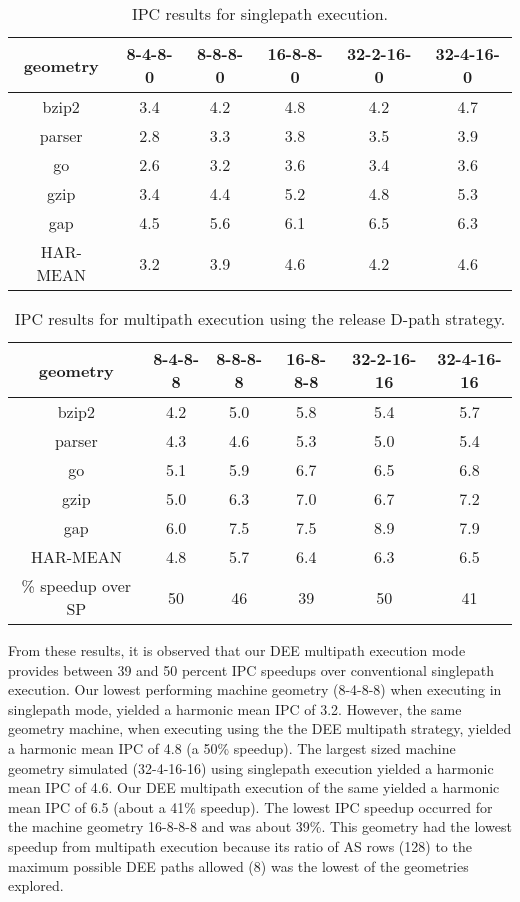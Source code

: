 \documentclass[10pt,twocolumn,dvips]{article}
\begin{document}
\begin{table*}
\scriptsize{
\begin{center}
\caption{IPC results for singlepath execution.}
\label{tab:ipc1}
\begin{tabular}{|c|c|c|c|c|c|}
\hline 
geometry&
8-4-8-0&
8-8-8-0&
16-8-8-0&
32-2-16-0&
32-4-16-0\\
\hline 
\hline
bzip2&3.4&4.2&4.8&4.2&4.7\\
\hline 
parser&2.8&3.3&3.8&3.5&3.9\\
\hline 
go&2.6&3.2&3.6&3.4&3.6\\
\hline 
gzip&3.4&4.4&5.2&4.8&5.3\\
\hline 
gap&4.5&5.6&6.1&6.5&6.3\\
\hline
\hline 
HAR-MEAN&3.2&3.9&4.6&4.2&4.6\\
\hline
\end{tabular}
\end{center}
}
\end{table*}
%
%
\begin{table*}
\scriptsize{
\begin{center}
\caption{IPC results for multipath execution using the 
release D-path strategy.}
\label{tab:ipc3}
\begin{tabular}{|c|c|c|c|c|c|}
\hline 
geometry&
8-4-8-8&
8-8-8-8&
16-8-8-8&
32-2-16-16&
32-4-16-16\\
\hline 
\hline
bzip2&4.2&5.0&5.8&5.4&5.7\\
\hline 
parser&4.3&4.6&5.3&5.0&5.4\\
\hline 
go&5.1&5.9&6.7&6.5&6.8\\
\hline 
gzip&5.0&6.3&7.0&6.7&7.2\\
\hline 
gap&6.0&7.5&7.5&8.9&7.9\\
\hline 
\hline 
HAR-MEAN&4.8&5.7&6.4&6.3&6.5\\
\hline
\% speedup over SP&50&46&39&50&41\\
\hline
\end{tabular}
\end{center}
}
\end{table*}
%
%
From these results, 
it is observed that our DEE multipath execution mode
provides between 39 and 50 percent IPC speedups over conventional
singlepath execution.
Our lowest performing machine geometry (8-4-8-8) when executing
in singlepath mode, yielded a harmonic mean IPC of 3.2.
However, the same geometry machine, when executing using the
the DEE multipath strategy, yielded a harmonic mean IPC of 4.8 (a
50\% speedup).
The largest sized machine geometry
simulated (32-4-16-16) using singlepath execution yielded 
a harmonic mean IPC of 4.6.  
Our DEE multipath execution of 
the same yielded a harmonic mean IPC of 6.5 (about
a 41\% speedup).  The lowest IPC speedup occurred for the machine 
geometry 16-8-8-8 and was about 39\%.  This geometry had the lowest
speedup from multipath execution because its ratio of AS rows (128)
to the maximum possible DEE paths allowed (8) was the lowest of
the geometries explored.
%
%
\end{document}
